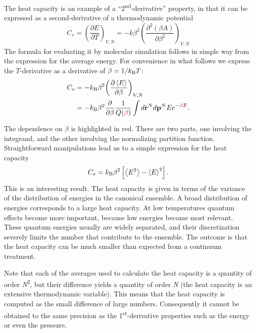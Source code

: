 \documentclass[9pt,bestpractices]{molsim}
\begin{document}
The heat capacity is an example of a
``2\textsuperscript{nd}-derivative'' property, in that it can be
expressed as a second-derivative of a thermodynamic potential
\[{C_v} = {\left( {\frac{{\partial E}}{{\partial T}}} \right)_{V,N}} =  - k{\beta ^2}{\left( {\frac{{{\partial ^2}(\beta A)}}{{\partial {\beta ^2}}}} \right)_{V,N}}\]
The formula for evaluating it by molecular simulation follows in simple
way from the expression for the average energy. For convenience in what
follows we express the $T$-derivative as a derivative of $\beta = 1/k_{\rm B}T$:
\begin{align*}
{C_v} &=  - k_{\rm B}{\beta ^2}{\left( {\frac{{\partial \left\langle E \right\rangle }}{{\partial \beta }}} \right)_{V,N}}\\
 &=  - k_{\rm B}{\beta ^2}\frac{\partial }{{\partial \beta }}\frac{1}{{Q({\color{red} \beta} )}}\int {d{{\bf r}^N}d{{\bf p}^N}} E{e^{ - {\color{red} \beta} E}}.
\end{align*}

The dependence on $\beta$ is highlighted in red. There are two parts, one
involving the integrand, and the other involving the normalizing
partition function. Straightforward manipulations lead us to a simple
expression for the heat capacity
\[{C_v} = k_{\rm B}{\beta ^2}\left[ {\left\langle {{E^2}} \right\rangle  - {{\left\langle E \right\rangle }^2}} \right].\]
This is an interesting result. The heat capacity is given in terms of
the variance of the distribution of energies in the canonical ensemble.
A broad distribution of energies corresponds to a large heat capacity.
At low temperatures quantum effects become more important, because low
energies become most relevant. These quantum energies usually are widely
separated, and their discretization severely limits the number that
contribute to the ensemble. The outcome is that the heat capacity can be
much smaller than expected from a continuum treatment.

Note that each of the averages used to calculate the heat capacity is a
quantity of order \emph{N}\textsuperscript{2}, but their difference
yields a quantity of order \emph{N} (the heat capacity is an extensive
thermodynamic variable). This means that the heat capacity is computed
as the small difference of large numbers. Consequently it cannot be
obtained to the same precision as the 1\textsuperscript{st}-derivative
properties such as the energy or even the pressure.
\end{document}
